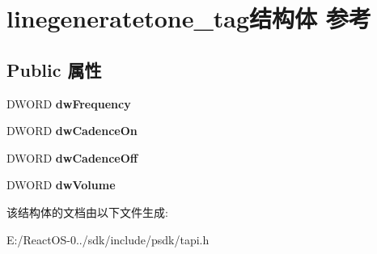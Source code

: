 \hypertarget{structlinegeneratetone__tag}{}\section{linegeneratetone\+\_\+tag结构体 参考}
\label{structlinegeneratetone__tag}
\subsection*{Public 属性}
\begin{DoxyCompactItemize}
\item 
\mbox{\label{structlinegeneratetone__tag_a5fee9d1ea0fcf092c80624f941a5f4e5}} 
D\+W\+O\+RD {\bfseries dw\+Frequency}
\item 
\mbox{\label{structlinegeneratetone__tag_af8776d9f3a2c64cf4b99d87f39dcce50}} 
D\+W\+O\+RD {\bfseries dw\+Cadence\+On}
\item 
\mbox{\label{structlinegeneratetone__tag_ae75a7d50f2c6edb34ebe9c269a3d3305}} 
D\+W\+O\+RD {\bfseries dw\+Cadence\+Off}
\item 
\mbox{\label{structlinegeneratetone__tag_ac6bcfa3cdaedc506c472c7961e275f31}} 
D\+W\+O\+RD {\bfseries dw\+Volume}
\end{DoxyCompactItemize}


该结构体的文档由以下文件生成\+:\begin{DoxyCompactItemize}
\item 
E\+:/\+React\+O\+S-\/0../sdk/include/psdk/tapi.\+h\end{DoxyCompactItemize}
